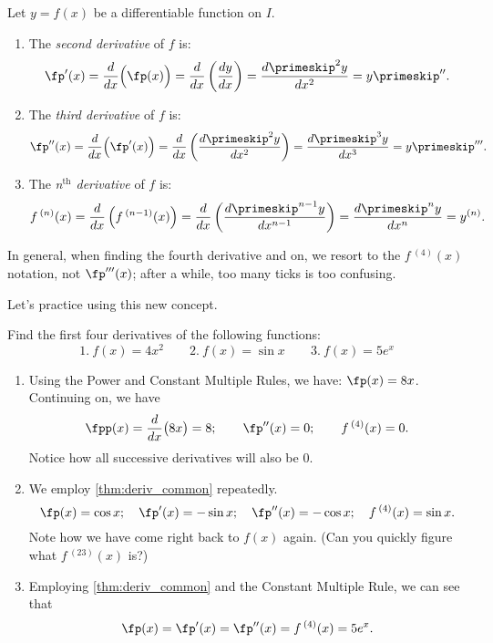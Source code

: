 \begin{definition}\label{def:Higher_Deriv}
Let $y=f(x)$ be a differentiable function on $I$. 
		\begin{enumerate}
		\item		The \emph{second derivative} of $f$ is: 
						\[ \fp'(x) = \frac{d}{dx}\Bigl(\fp(x)\Bigr) = \frac{d}{dx}\left(\frac{dy}{dx}\right) = \frac{d\primeskip^2y}{dx^2}=y\primeskip''.\]
				\item		The \emph{third derivative} of $f$ is: 
						\[ \fp''(x) = \frac{d}{dx}\Bigl(\fp'(x)\Bigr) = \frac{d}{dx}\left(\frac{d\primeskip^2y}{dx^2}\right) = \frac{d\primeskip^3y}{dx^3}=y\primeskip'''.\]
				\item		The \emph{n$^{\text{th}}$ derivative} of $f$ is:
						\[ f\,^{(n)}(x) = \frac{d}{dx}\left(f\,^{(n-1)}(x)\right) = \frac{d}{dx}\left(\frac{d\primeskip^{n-1}y}{dx^{n-1}}\right) = \frac{d\primeskip^ny}{dx^n}=y^{(n)}.\]
		\end{enumerate}
\end{definition}


In general, when finding the fourth derivative and on, we resort to the $f\,^{(4)}(x)$ notation, not $\fp'''(x)$; after a while, too many ticks is too confusing.\bigskip

Let's practice using this new concept.

\begin{example}\label{ex_high_order}
Find the first four derivatives of the following functions:
\[1.\ f(x) = 4x^2\qquad 2.\ f(x) = \sin x\qquad 3.\ f(x) = 5e^x\]
\solution
\begin{enumerate}
	\item	Using the Power and Constant Multiple Rules, we have: $\fp(x) = 8x$. Continuing on, we have 
	\[\fpp(x) = \frac{d}{dx}\bigl(8x\bigr) = 8;\qquad \fp''(x) = 0;\qquad f\,^{(4)}(x) = 0.\]
Notice how all successive derivatives will also be 0.
	\item	We employ \autoref{thm:deriv_common} repeatedly.
	\[\fp(x) = \cos x;\quad \fp'(x) = -\sin x;\quad \fp''(x) = -\cos x;\quad f\,^{(4)}(x) = \sin x.\]
	Note how we have come right back to $f(x)$ again. (Can you quickly figure what $f\,^{(23)}(x)$ is?)
	\item	Employing \autoref{thm:deriv_common} and the Constant Multiple Rule, we can see that
	\[\fp(x) = \fp'(x) = \fp''(x) = f\,^{(4)}(x) = 5e^x.\]
	\end{enumerate}
\end{example}

